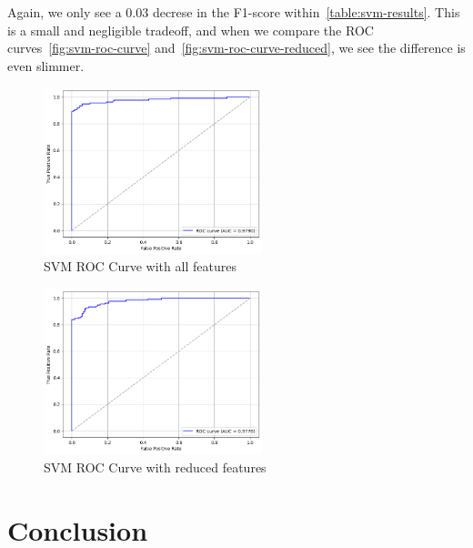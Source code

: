 \documentclass[conference]{IEEEtran}
\begin{document}
Again, we only see a 0.03 decrese in the F1-score within~\autoref{table:svm-results}. This is a small and negligible tradeoff, and when we compare the ROC curves~\autoref{fig:svm-roc-curve} and~\autoref{fig:svm-roc-curve-reduced}, we see the difference is even slimmer.

\begin{figure}[h]
	\begin{center}
		\includegraphics[width=2.5in]{svm-roc-curve}
		\caption{SVM ROC Curve with all features}\label{fig:svm-roc-curve}
	\end{center}
\end{figure}

\begin{figure}[h]
	\begin{center}
		\includegraphics[width=2.5in]{svm-roc-curve-reduced}
		\caption{SVM ROC Curve with reduced features}\label{fig:svm-roc-curve-reduced}
	\end{center}
\end{figure}



\section{Conclusion}
\end{document}
